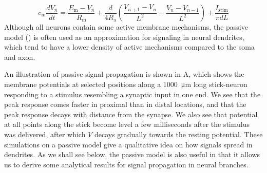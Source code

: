 \begin{equation}
c_\text{m} \frac{dV_n}{dt} = \frac{E_\text{m}-V_n}{R_\text{m}} + \frac{d}{4R_\text{a}}\left(\frac{V_{n+1}-V_n}{L^2} - \frac{V_n-V_{n-1}}{L^2} \right) + \frac{I_\text{stim}}{\pi d L}
\label{eq:Neuron:multipassive}
\end{equation}
Although all neurons contain some active membrane mechanisms, the passive model () is often used as an approximation for signaling in neural dendrites, which tend to have a lower density of active mechanisms compared to the soma and axon. 

An illustration of passive signal propagation is shown in A, which shows the membrane potentials at selected positions along a 1000~\si{\micro\metre} long stick-neuron responding to a stimulus resembling a synaptic input in one end. We see that the peak response comes faster in proximal than in distal locations, and that the peak response decays with distance from the synapse. We also see that potential at all points along the stick become level a few milliseconds after the stimulus was delivered, after which $V$ decays gradually towards the resting potential. These simulations on a passive model give a qualitative idea on how signals spread in dendrites. As we shall see below, the passive model is also useful in that it allows us to derive some analytical results for signal propagation in neural branches.


